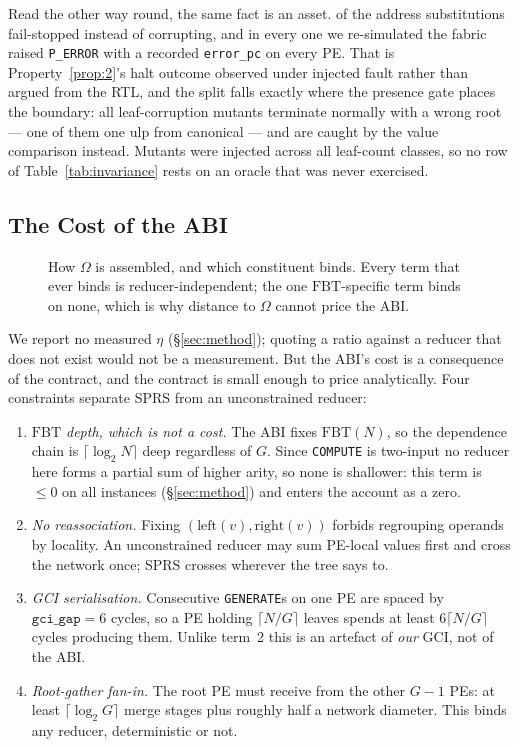 \documentclass[journal,10pt]{IEEEtran}
\theoremstyle{plain}
\theoremstyle{definition}
\theoremstyle{remark}
\newcommand{\FBT}{\ensuremath{\mathrm{FBT}}}
\newcommand{\sprs}{\textsc{SPRS}}
\newcommand{\sv}[1]{\texttt{#1}}
\begin{document}
Read the other way round, the same fact is an asset. \MutAddrStall{} of the
\MutAddrSub{} address substitutions fail-stopped instead of corrupting, and in
every one we re-simulated the fabric raised \texttt{P\_ERROR} with a recorded
\sv{error\_pc} on every PE. That is Property~\ref{prop:2}'s halt outcome
observed under injected fault rather than argued from the RTL, and the split
falls exactly where the presence gate places the boundary: all \MutLeaf{}
leaf-corruption mutants terminate normally with a wrong root --- one of them
one ulp from canonical --- and are caught by the value comparison instead.
Mutants were injected across all \InvLeafCounts{} leaf-count classes, so no
row of Table~\ref{tab:invariance} rests on an oracle that was never exercised.

\subsection{The Cost of the ABI}\label{sec:results-overhead}

\begin{figure}[!t]\centering

\caption{How $\Omega$ is assembled, and which constituent binds. Every term that ever binds is reducer-independent; the one $\FBT$-specific term binds on none, which is why distance to $\Omega$ cannot price the ABI.}\label{fig:omegadecomp}
\end{figure}


We report no measured $\eta$ (\S\ref{sec:method}); quoting a ratio against a
reducer that does not exist would not be a measurement. But the ABI's cost is a
consequence of the contract, and the contract is small enough to price
analytically. Four constraints separate \sprs{} from an unconstrained reducer:

\begin{enumerate}[leftmargin=1.4em]
\item \emph{\FBT{} depth, which is not a cost.} The ABI fixes $\FBT(N)$, so
  the dependence chain is $\lceil\log_2 N\rceil$ deep regardless of $G$. Since
  \texttt{COMPUTE} is two-input no reducer here forms a partial sum of higher
  arity, so none is shallower: this term is $\le 0$ on all \TournNInst{}
  instances (\S\ref{sec:method}) and enters the account as a zero.
\item \emph{No reassociation.} Fixing $(\mathrm{left}(v),\mathrm{right}(v))$
  forbids regrouping operands by locality. An unconstrained reducer may sum
  PE-local values first and cross the network once; \sprs{} crosses wherever
  the tree says to.
\item \emph{GCI serialisation.} Consecutive \texttt{GENERATE}s on one PE are
  spaced by $\sv{gci\_gap} = 6$ cycles, so a PE holding $\lceil N/G\rceil$
  leaves spends at least $6\lceil N/G\rceil$ cycles producing them. Unlike
  term~2 this is an artefact of \emph{our} GCI, not of the ABI.
\item \emph{Root-gather fan-in.} The root PE must receive from the other $G-1$
  PEs: at least $\lceil\log_2 G\rceil$ merge stages plus roughly half a
  network diameter. This binds any reducer, deterministic or not.
\end{enumerate}
\end{document}
